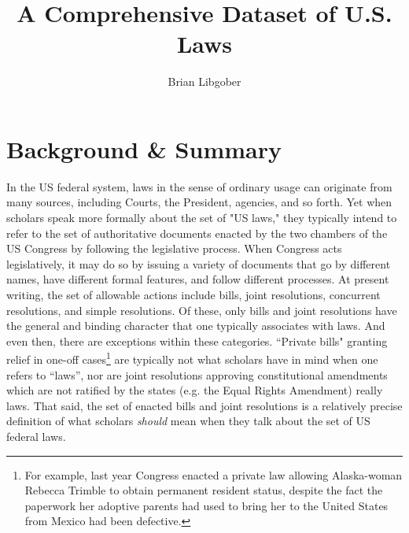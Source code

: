 \documentclass[fleqn,10pt]{wlscirep}
\title{A Comprehensive Dataset of U.S. Laws }
\author[$\dag$]{Brian Libgober}
\affil[$\dag$]{Northwestern University, Department of Political Science and School of Law, Evanston, IL, 60202, USA. brian.libgober@northwestern.edu}
\begin{document}
\flushbottom
\maketitle

\thispagestyle{empty}

\section*{Background \& Summary}


In the US federal system, laws in the sense of ordinary usage can originate from many sources, including Courts, the President, agencies, and so forth. Yet when scholars speak more formally about the set of "US laws," they typically intend to refer to the set of authoritative documents enacted by the two chambers of the US Congress by following the legislative process. When Congress acts legislatively, it may do so by issuing a variety of documents that go by different names, have different formal features, and follow different processes. At present writing, the set of allowable actions include bills, joint resolutions, concurrent resolutions, and simple resolutions. Of these, only bills and joint resolutions have the general and binding character that one typically associates with laws. And even then, there are exceptions within these categories. ``Private bills" granting relief in one-off cases\footnote{For example, last year Congress enacted a private law allowing Alaska-woman Rebecca Trimble to obtain permanent resident status, despite the fact the paperwork her adoptive parents had used to bring her to the United States from Mexico had been defective.} are typically not what scholars have in mind when one refers to ``laws'', nor are joint resolutions approving constitutional amendments which are not ratified by the states (e.g. the Equal Rights Amendment) really laws. That said, the set of enacted bills and joint resolutions is a relatively precise definition of what scholars \textit{should} mean when they talk about the set of US federal laws.
\end{document}
